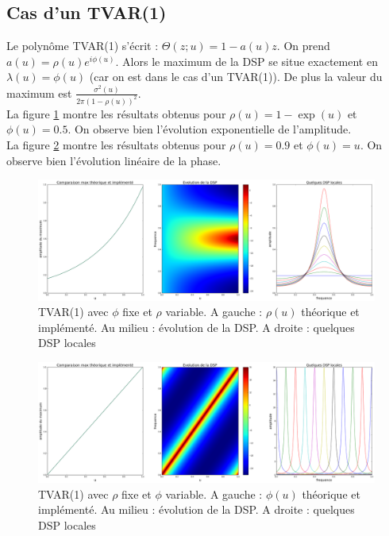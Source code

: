 \documentclass{report}
\begin{document}
\subsection{Cas d'un TVAR(1)}

Le polynôme TVAR(1) s'écrit : $\Theta(z;u) = 1-a(u)z$. On prend $a(u)=\rho(u)e^{i\phi(u)}$. Alors le maximum de la DSP se situe exactement en $\lambda(u) = \phi(u)$ (car on est dans le cas d'un TVAR(1)). De plus la valeur du maximum est $\frac{\sigma^2(u)}{2\pi(1-\rho(u))^2}$. \\
La figure \ref{fig:TVAR1_module} montre les résultats obtenus pour $\rho(u)=1-\exp(u)$ et $\phi(u)=0.5$. On observe bien l'évolution exponentielle de l'amplitude. \\
La figure \ref{fig:TVAR1_phase} montre les résultats obtenus pour $\rho(u)=0.9$ et $\phi(u)=u$. On observe bien l'évolution linéaire de la phase. \\
\begin{figure}[h]
\includegraphics[scale=0.3]{presentation/images/TVAR1_module.png}
\caption{TVAR(1) avec $\phi$ fixe et $\rho$ variable. A gauche : $\rho(u)$ théorique et implémenté. Au milieu : évolution de la DSP. A droite : quelques DSP locales}
\label{fig:TVAR1_module}
\end{figure}

\begin{figure}[h]
\includegraphics[scale=0.3]{presentation/images/TVAR1_phase.png}
\caption{TVAR(1) avec $\rho$ fixe et $\phi$ variable. A gauche : $\phi(u)$ théorique et implémenté. Au milieu : évolution de la DSP. A droite : quelques DSP locales}
\label{fig:TVAR1_phase}
\end{figure}
\end{document}
